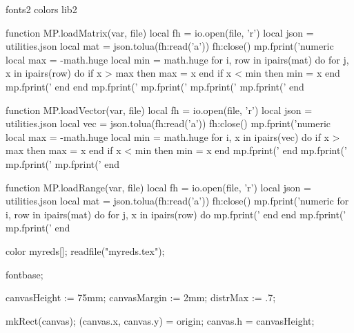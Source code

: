 \environment fonts2
\environment colors
\environment lib2


\startluacode

function MP.loadMatrix(var, file)
  local fh = io.open(file, 'r')
  local json = utilities.json
  local mat = json.tolua(fh:read('a'))
  fh:close()
  mp.fprint('numeric %
  local max = -math.huge
  local min = math.huge
  for i, row in ipairs(mat) do
    for j, x in ipairs(row) do
      if x > max then
        max = x
      end
      if x < min then
        min = x
      end
      mp.fprint('%
    end
  end
  mp.fprint('%
  mp.fprint('%
  mp.fprint('%
  mp.fprint('%
end

function MP.loadVector(var, file)
  local fh = io.open(file, 'r')
  local json = utilities.json
  local vec = json.tolua(fh:read('a'))
  fh:close()
  mp.fprint('numeric %
  local max = -math.huge
  local min = math.huge
  for i, x in ipairs(vec) do
    if x > max then
      max = x
    end
    if x < min then
      min = x
    end
    mp.fprint('%
  end
  mp.fprint('%
  mp.fprint('%
  mp.fprint('%
end

function MP.loadRange(var, file)
  local fh = io.open(file, 'r')
  local json = utilities.json
  local mat = json.tolua(fh:read('a'))
  fh:close()
  mp.fprint('numeric %
  for i, row in ipairs(mat) do
    for j, x in ipairs(row) do
      mp.fprint('%
    end
  end
  mp.fprint('%
  mp.fprint('%
end

\stopluacode

\startMPinitializations

color myreds[];
readfile("myreds.tex");

fontbase;

canvasHeight := 75mm;
canvasMargin := 2mm;
distrMax := .7;



mkRect(canvas);
(canvas.x, canvas.y) = origin;
canvas.h = canvasHeight;

